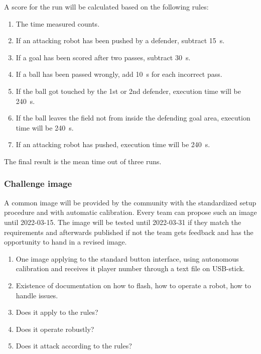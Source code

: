        A score for the run will be calculated based on the following rules:

        \begin{enumerate}
            \item The time measured counts.
            \item If an attacking robot has been pushed by a defender, subtract \qty{15}{\second}.
            \item If a goal has been scored after two passes, subtract \qty{30}{\second}.
            \item If a ball has been passed wrongly, add \qty{10}{\second} for each incorrect pass.
            \item If the ball got touched by the 1st or 2nd defender, execution time will be \qty{240}{\second}.
            \item If the ball leaves the field not from inside the defending goal area, execution time will be \qty{240}{\second}.
            \item If an attacking robot has pushed, execution time will be \qty{240}{\second}.
        \end{enumerate}

        The final result is the mean time out of three runs.

    \subsubsection{Challenge image}
        \label{sec:Challenge_image}
        A common image will be provided by the community with the standardized setup procedure and with automatic calibration. Every team can propose such an image until 2022-03-15. The image will be tested until 2022-03-31 if they match the requirements and afterwards published if not the team gets feedback and has the opportunity to hand in a revised image.

        \begin{enumerate}
            \item One image applying to the standard button interface, using autonomous calibration and receives it player number through a text file on USB-stick.
            \item Existence of documentation on how to flash, how to operate a robot, how to handle issues.
            \item Does it apply to the rules?
            \item Does it operate robustly?
            \item Does it attack according to the rules?
        \end{enumerate}


